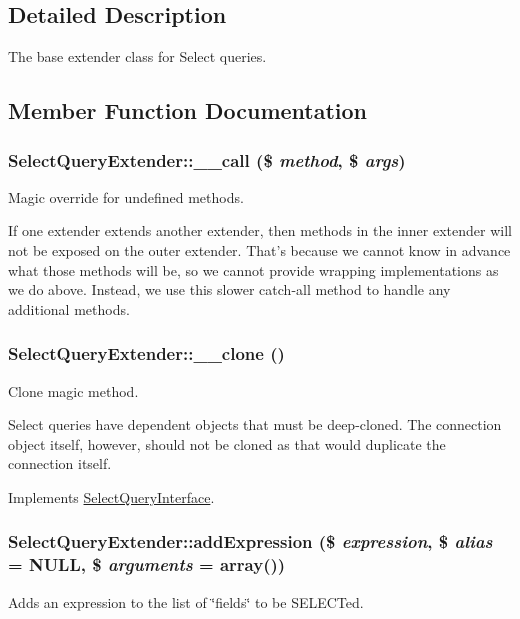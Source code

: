 \subsection{Detailed Description}
The base extender class for Select queries. 

\subsection{Member Function Documentation}
\hypertarget{classSelectQueryExtender_a8cbcdc84cab9b35505c10b51d13efa89}{
\subsubsection[{\_\-\_\-call}]{\setlength{\rightskip}{0pt plus 5cm}SelectQueryExtender::\_\-\_\-call (\$ {\em method}, \/  \$ {\em args})}}
\label{classSelectQueryExtender_a8cbcdc84cab9b35505c10b51d13efa89}
Magic override for undefined methods.

If one extender extends another extender, then methods in the inner extender will not be exposed on the outer extender. That's because we cannot know in advance what those methods will be, so we cannot provide wrapping implementations as we do above. Instead, we use this slower catch-\/all method to handle any additional methods. \hypertarget{classSelectQueryExtender_a3d9ade6266951fdc8e5757c8e61b352c}{
\subsubsection[{\_\-\_\-clone}]{\setlength{\rightskip}{0pt plus 5cm}SelectQueryExtender::\_\-\_\-clone ()}}
\label{classSelectQueryExtender_a3d9ade6266951fdc8e5757c8e61b352c}
Clone magic method.

Select queries have dependent objects that must be deep-\/cloned. The connection object itself, however, should not be cloned as that would duplicate the connection itself. 

Implements \hyperlink{interfaceSelectQueryInterface_a5ed9c2932a32b2649a252e5594e1df83}{SelectQueryInterface}.\hypertarget{classSelectQueryExtender_a6e05e811e495e6f36fb0ec1ef21abbc1}{
\subsubsection[{addExpression}]{\setlength{\rightskip}{0pt plus 5cm}SelectQueryExtender::addExpression (\$ {\em expression}, \/  \$ {\em alias} = {\ttfamily NULL}, \/  \$ {\em arguments} = {\ttfamily array()})}}
\label{classSelectQueryExtender_a6e05e811e495e6f36fb0ec1ef21abbc1}
Adds an expression to the list of \char`\"{}fields\char`\"{} to be SELECTed.

